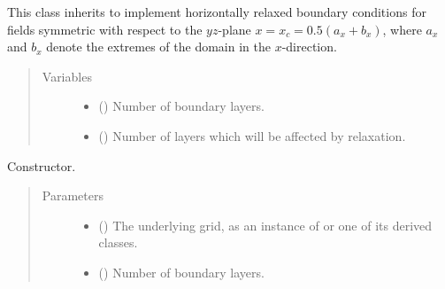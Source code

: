 \documentclass[letterpaper,10pt,english]{sphinxmanual}
\begin{document}
\begin{fulllineitems}
\label{\detokenize{api:dycore.horizontal_boundary.RelaxedSymmetricYZ}}
This class inherits {\hyperref[\detokenize{api:dycore.horizontal_boundary.Relaxed}]{}} to implement horizontally relaxed boundary conditions
for fields symmetric with respect to the \(yz\)-plane \(x = x_c = 0.5 (a_x + b_x)\),
where \(a_x\) and \(b_x\) denote the extremes of the domain in the \(x\)-direction.
\begin{quote}\begin{description}
\item[{Variables}] \leavevmode\begin{itemize}
\item {} 
{\hyperref[\detokenize{api:dycore.isentropic_prognostic.IsentropicPrognostic.nb}]{}} () \textendash{} Number of boundary layers.

\item {} 
 () \textendash{} Number of layers which will be affected by relaxation.

\end{itemize}

\end{description}\end{quote}

\begin{fulllineitems}
\label{\detokenize{api:dycore.horizontal_boundary.RelaxedSymmetricYZ.__init__}}
Constructor.
\begin{quote}\begin{description}
\item[{Parameters}] \leavevmode\begin{itemize}
\item {} 
 () \textendash{} The underlying grid, as an instance of {\hyperref[\detokenize{api:grids.xyz_grid.XYZGrid}]{}} or one of
its derived classes.

\item {} 
 () \textendash{} Number of boundary layers.


\end{itemize}
\end{description}
\end{quote}
\end{fulllineitems}
\end{fulllineitems}
\end{document}
